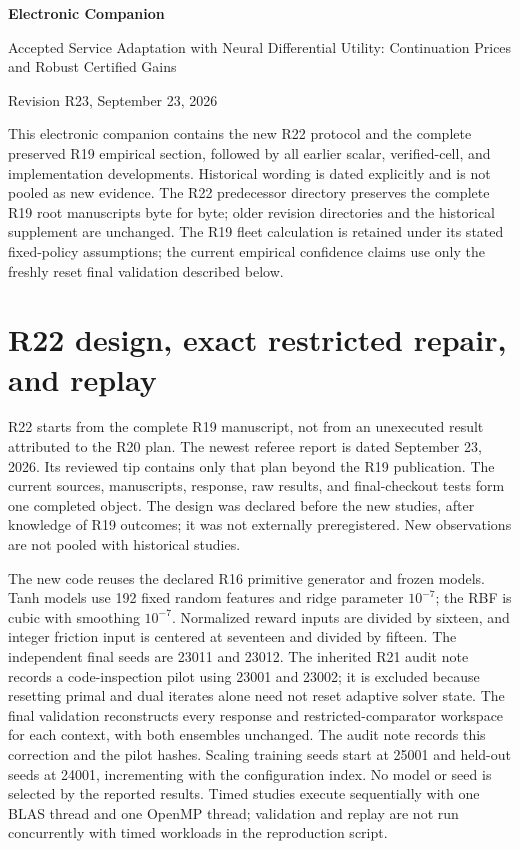 \documentclass[11pt,letterpaper]{article}
\theoremstyle{definition}
\newcommand{\1}{\mathbf 1}
\begin{document}
\begin{center}{\Large\bfseries Electronic Companion\par}\medskip
{\large Accepted Service Adaptation with Neural Differential Utility: Continuation Prices and Robust Certified Gains\par}\medskip
Revision R23, September 23, 2026
\end{center}
This electronic companion contains the new R22 protocol and the complete preserved R19 empirical section, followed by all earlier scalar, verified-cell, and implementation developments. Historical wording is dated explicitly and is not pooled as new evidence. The R22 predecessor directory preserves the complete R19 root manuscripts byte for byte; older revision directories and the historical supplement are unchanged. The R19 fleet calculation is retained under its stated fixed-policy assumptions; the current empirical confidence claims use only the freshly reset final validation described below.

\section{R22 design, exact restricted repair, and replay}\label{ec:r22-details}
R22 starts from the complete R19 manuscript, not from an unexecuted result attributed to the R20 plan. The newest referee report is dated September 23, 2026. Its reviewed tip contains only that plan beyond the R19 publication. The current sources, manuscripts, response, raw results, and final-checkout tests form one completed object. The design was declared before the new studies, after knowledge of R19 outcomes; it was not externally preregistered. New observations are not pooled with historical studies.

The new code reuses the declared R16 primitive generator and frozen models. Tanh models use 192 fixed random features and ridge parameter $10^{-7}$; the RBF is cubic with smoothing $10^{-7}$. Normalized reward inputs are divided by sixteen, and integer friction input is centered at seventeen and divided by fifteen. The independent final seeds are 23011 and 23012. The inherited R21 audit note records a code-inspection pilot using 23001 and 23002; it is excluded because resetting primal and dual iterates alone need not reset adaptive solver state. The final validation reconstructs every response and restricted-comparator workspace for each context, with both ensembles unchanged. The audit note records this correction and the pilot hashes. Scaling training seeds start at 25001 and held-out seeds at 24001, incrementing with the configuration index. No model or seed is selected by the reported results. Timed studies execute sequentially with one BLAS thread and one OpenMP thread; validation and replay are not run concurrently with timed workloads in the reproduction script.
\end{document}
